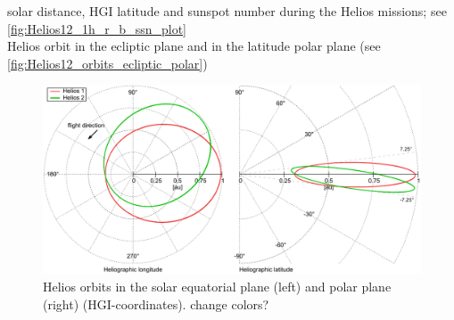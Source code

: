 solar distance, HGI latitude and sunspot number during the Helios missions; see \autoref{fig:Helios12_1h_r_b_ssn_plot}\\

Helios orbit in the ecliptic plane and in the latitude polar plane (see \autoref{fig:Helios12_orbits_ecliptic_polar})\\
\begin{figure}[htb]
	\centering
	\includegraphics[width=\textwidth]{images/gnuplots/Helios12_orbits_ecliptic_polar.pdf}
	\caption{Helios orbits in the solar equatorial plane (left) and polar plane (right) (HGI-coordinates). change colors?}
	\label{fig:Helios12_orbits_ecliptic_polar}
\end{figure}

